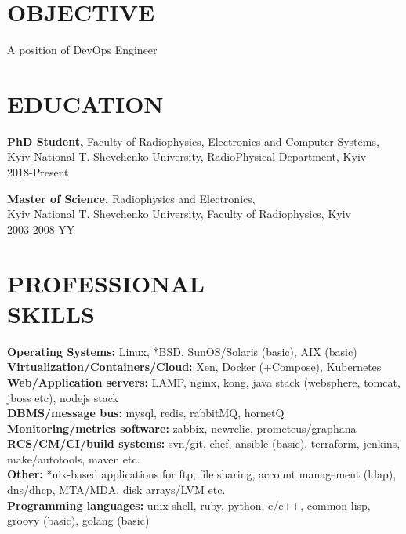 \documentclass[mymargin,10pt]{res} %
\begin{document}
\begin{resume}


\section{OBJECTIVE}

A position of DevOps Engineer


\section{EDUCATION}

{\bf PhD Student,} Faculty of Radiophysics, Electronics and Computer Systems, \\
Kyiv National T. Shevchenko University, RadioPhysical Department, Kyiv \\
2018-Present

{\bf Master of Science,} Radiophysics and Electronics, \\
Kyiv National T. Shevchenko University, Faculty of Radiophysics, Kyiv \\
2003-2008 YY


\section{PROFESSIONAL \\ SKILLS}

{\bf Operating Systems:} Linux, *BSD, SunOS/Solaris (basic), AIX (basic) \\
{\bf Virtualization/Containers/Cloud:} Xen, Docker (+Compose), Kubernetes \\
{\bf Web/Application servers:} LAMP, nginx, kong, java stack (websphere, tomcat, jboss etc), nodejs stack \\
{\bf DBMS/message bus:} mysql, redis, rabbitMQ, hornetQ \\
{\bf Monitoring/metrics software:}  zabbix, newrelic, prometeus/graphana \\
{\bf RCS/CM/CI/build systems:} svn/git, chef, ansible (basic), terraform, jenkins, make/autotools, maven etc. \\
{\bf Other:} *nix-based applications for ftp, file sharing, account management (ldap), dns/dhcp, MTA/MDA, disk arrays/LVM etc. \\
{\bf Programming languages:} unix shell, ruby, python, c/c++, common lisp, groovy (basic), golang (basic) \\


\end{resume}
\end{document}
